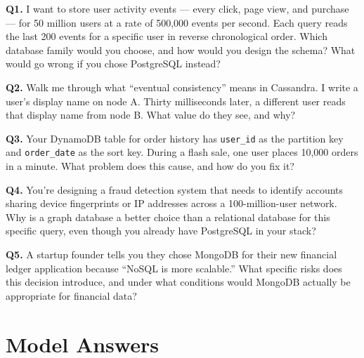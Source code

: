 \documentclass[11pt,a4paper]{article}
\begin{document}
\begin{quizbox}
\textbf{Q1.} I want to store user activity events --- every click, page view, and purchase --- for 50 million users at a rate of 500,000 events per second. Each query reads the last 200 events for a specific user in reverse chronological order. Which database family would you choose, and how would you design the schema? What would go wrong if you chose PostgreSQL instead?

\bigskip
\textbf{Q2.} Walk me through what ``eventual consistency'' means in Cassandra. I write a user's display name on node A. Thirty milliseconds later, a different user reads that display name from node B. What value do they see, and why?

\bigskip
\textbf{Q3.} Your DynamoDB table for order history has \texttt{user\_id} as the partition key and \texttt{order\_date} as the sort key. During a flash sale, one user places 10,000 orders in a minute. What problem does this cause, and how do you fix it?

\bigskip
\textbf{Q4.} You're designing a fraud detection system that needs to identify accounts sharing device fingerprints or IP addresses across a 100-million-user network. Why is a graph database a better choice than a relational database for this specific query, even though you already have PostgreSQL in your stack?

\bigskip
\textbf{Q5.} A startup founder tells you they chose MongoDB for their new financial ledger application because ``NoSQL is more scalable.'' What specific risks does this decision introduce, and under what conditions would MongoDB actually be appropriate for financial data?
\end{quizbox}

\newpage

\section*{Model Answers}
\end{document}
